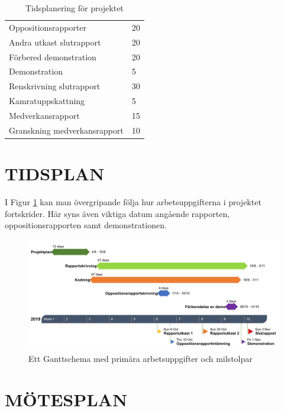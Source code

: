 \documentclass[a4paper]{article}
\begin{document}
\begin{table}[b]
\begin{tabular}{|l|l|}
Oppositionsrapporter                                      & 20               \\
Andra utkast slutrapport                                  & 20               \\
Förbered demonstration                                    & 20               \\
Demonstration                                             & 5               \\
Renskrivning slutrapport                                  & 30               \\
Kamratuppskattning                                        & 5                \\
Medverkansrapport                                         & 15               \\
Granskning medverkansrapport                              & 10               \\ \hline
\end{tabular}
\caption{Tidsplanering för projektet}
\label{tab:aktiviteter}
\end{table}

\section{TIDSPLAN}
\label{sec:tidsplan}

I Figur \ref{fig:Gantt} kan man övergripande följa hur arbetsuppgifterna i projektet fortskrider. Här syns även viktiga datum angående rapporten, oppositionsrapporten samt demonstrationen.

\begin{figure}[!ht]
	\includegraphics[width=1\textwidth]{figurer/Gantt.png}
	\caption{Ett Ganttschema med primära arbetsuppgifter och milstolpar}
	\label{fig:Gantt}
\end{figure}

\section{MÖTESPLAN}
\label{sec:mötesplan}
\end{document}
